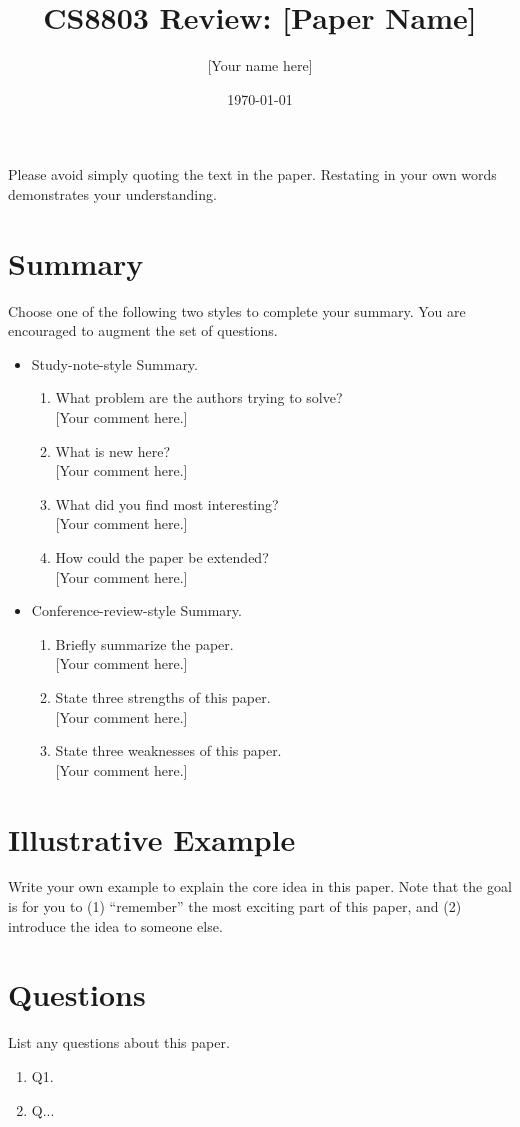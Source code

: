 \documentclass[12pt]{extarticle}
\title{CS8803 Review: [Paper Name]}
\author{[Your name here]}
\date{\today}
\begin{document}
\maketitle

Please avoid simply quoting the text in the paper. Restating in your own words
demonstrates your understanding.
\section{Summary}
Choose one of the following two styles to complete your summary. You are
encouraged to augment the set of questions.
\begin{itemize}
\item Study-note-style Summary.
  \begin{enumerate}
  \item What problem are the authors trying to solve?\\
    {[Your comment here.]}
  \item What is new here?\\
    {[Your comment here.]}
  \item What did you find most interesting?\\
    {[Your comment here.]}
  \item How could the paper be extended?\\
    {[Your comment here.]}
  \end{enumerate}
\item Conference-review-style Summary.
  \begin{enumerate}

  \item Briefly summarize the paper.\\
    {[Your comment here.]}
  \item State three strengths of this paper.\\
    {[Your comment here.]}
  \item State three weaknesses of this paper.\\
    {[Your comment here.]}
  \end{enumerate}
\end{itemize}
\vfill
\pagebreak
\section{Illustrative Example}
Write your own example to explain the core idea in this paper. Note that the
goal is for you to (1) ``remember'' the most exciting part of this paper, and
(2) introduce the idea to someone else.

\pagebreak
\section{Questions}
List any questions about this paper.
\begin{enumerate}
\item Q1.
\item Q...
\end{enumerate}
\end{document}
